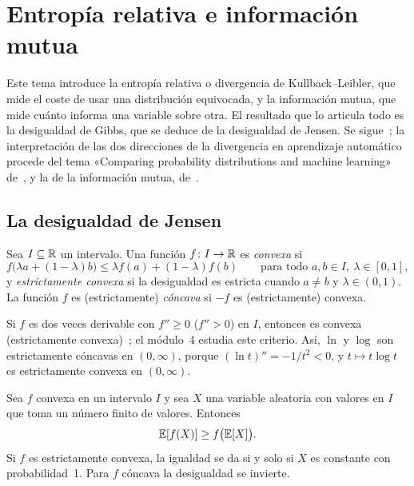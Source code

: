 \chapter{Entropía relativa e información mutua}
\label{tema:2}

Este tema introduce la entropía relativa o divergencia de Kullback--Leibler, que mide el coste de usar una distribución equivocada, y la información mutua, que mide cuánto informa una variable sobre otra. El resultado que lo articula todo es la desigualdad de Gibbs, que se deduce de la desigualdad de Jensen. Se sigue~\cite[§2.3--2.6 y §2.8]{ct}; la interpretación de las dos direcciones de la divergencia en aprendizaje automático procede del tema «Comparing probability distributions and machine learning» de~\cite{camit}, y la de la información mutua, de~\cite[cap.~8]{mackay}.

\section{La desigualdad de Jensen}

\begin{definicion}\label{def:convexa}
Sea $I\subseteq\mathbb{R}$ un intervalo. Una función $f\colon I\to\mathbb{R}$ es \emph{convexa} si
\[
f\bigl(\lambda a+(1-\lambda)b\bigr)\le\lambda f(a)+(1-\lambda)f(b)\qquad\text{para todo }a,b\in I,\ \lambda\in[0,1],
\]
y \emph{estrictamente convexa} si la desigualdad es estricta cuando $a\ne b$ y $\lambda\in(0,1)$. La función $f$ es (estrictamente) \emph{cóncava} si $-f$ es (estrictamente) convexa.
\end{definicion}

Si $f$ es dos veces derivable con $f''\ge 0$ ($f''>0$) en $I$, entonces es convexa (estrictamente convexa)~\cite[§2.6]{ct}; el módulo~4 estudia este criterio. Así, $\ln$ y $\log$ son estrictamente cóncavas en $(0,\infty)$, porque $(\ln t)''=-1/t^{2}<0$, y $t\mapsto t\log t$ es estrictamente convexa en $(0,\infty)$.

\begin{teorema}\label{teo:jensen}
Sea $f$ convexa en un intervalo $I$ y sea $X$ una variable aleatoria con valores en $I$ que toma un número finito de valores. Entonces
\[
\mathbb{E}[f(X)]\ge f\bigl(\mathbb{E}[X]\bigr).
\]
Si $f$ es estrictamente convexa, la igualdad se da si y solo si $X$ es constante con probabilidad~1. Para $f$ cóncava la desigualdad se invierte.
\end{teorema}

